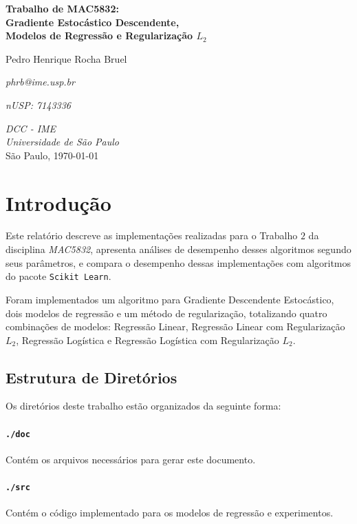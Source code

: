 \documentclass[a4paper, 12pt]{article}
\newcommand{\rom}[1]{\uppercase\expandafter{\romannumeral #1\relax}}
\begin{document}
\begin{titlepage}
    \centering
    \vspace*{4cm}
    \textbf{\Large{Trabalho \rom{2} de MAC5832: \\ Gradiente Estocástico Descendente, \\
    Modelos de Regressão e Regularização $L_2$}}\\

    \vskip 1cm

    Pedro Henrique Rocha Bruel

    \emph{phrb@ime.usp.br}

    \emph{nUSP: 7143336}

    \vfill
    \normalsize{\emph{DCC - IME\\
    Universidade de São Paulo}\\}
    \normalsize{São Paulo, \today}
\end{titlepage}

\section{Introdução} \label{sec:intro}

Este relatório descreve as implementações realizadas para o Trabalho $2$ da
disciplina \textit{MAC5832}, apresenta análises de desempenho desses algoritmos
segundo seus parâmetros, e compara o desempenho dessas implementações com
algoritmos do pacote \texttt{Scikit Learn}.

Foram implementados um algoritmo para Gradiente Descendente Estocástico, dois
modelos de regressão e um método de regularização, totalizando quatro
combinações de modelos: Regressão Linear, Regressão Linear com Regularização
$L_2$, Regressão Logística e Regressão Logística com Regularização $L_2$.

\subsection{Estrutura de Diretórios}

Os diretórios deste trabalho estão organizados da
seguinte forma:

\paragraph{\texttt{./doc}} Contém os arquivos necessários
para gerar este documento.

\paragraph{\texttt{./src}} Contém o código implementado
para os modelos de regressão e experimentos.
\end{document}
